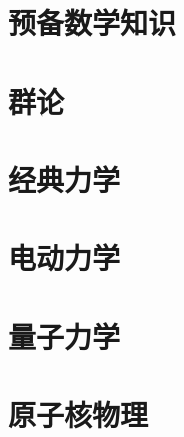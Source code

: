 \documentclass{sybook}
\begin{document}
\begin{sloppypar}



\tableofcontents
\newpage
\setcounter{page}{1}

\part{预备数学知识}





% 


\part{群论}


\part{经典力学}




\part{电动力学}




\part{量子力学}





\part{原子核物理}












\begin{appendices}
    \appendixpage
    \addappheadtotoc
    
    
\end{appendices}

\end{sloppypar}
\end{document}
